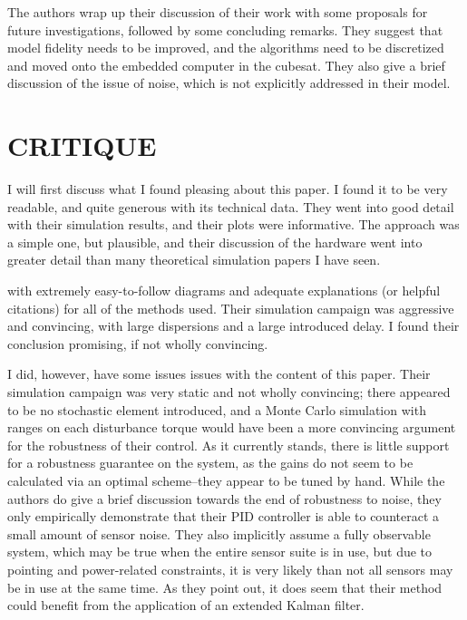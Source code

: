 \documentclass[letterpaper, 11 pt, conference]{ieeeconf}  %
\begin{document}
The authors wrap up their discussion of their work with some proposals for future investigations, followed by some concluding remarks. They suggest that model fidelity needs to be improved, and the algorithms need to be discretized and moved onto the embedded computer in the cubesat. They also give a brief discussion of the issue of noise, which is not explicitly addressed in their model.

\section{CRITIQUE}

I will first discuss what I found pleasing about this paper. I found it to be very readable, and quite generous with its technical data. They went into good detail with their simulation results, and their plots were informative. The approach was a simple one, but plausible, and their discussion of the hardware went into greater detail than many theoretical simulation papers I have seen.


with extremely easy-to-follow diagrams and adequate explanations (or helpful citations) for all of the methods used. Their simulation campaign was aggressive and convincing, with large dispersions and a large introduced delay. I found their conclusion promising, if not wholly convincing.

I did, however, have some issues issues with the content of this paper. Their simulation campaign was very static and not wholly convincing; there appeared to be no stochastic element introduced, and a Monte Carlo simulation with ranges on each disturbance torque would have been a more convincing argument for the robustness of their control. As it currently stands, there is little support for a robustness guarantee on the system, as the gains do not seem to be calculated via an optimal scheme--they appear to be tuned by hand. While the authors do give a brief discussion towards the end of robustness to noise, they only empirically demonstrate that their PID controller is able to counteract a small amount of sensor noise. They also implicitly assume a fully observable system, which may be true when the entire sensor suite is in use, but due to pointing and power-related constraints, it is very likely than not all sensors may be in use at the same time. As they point out, it does seem that their method could benefit from the application of an extended Kalman filter.
\end{document}
